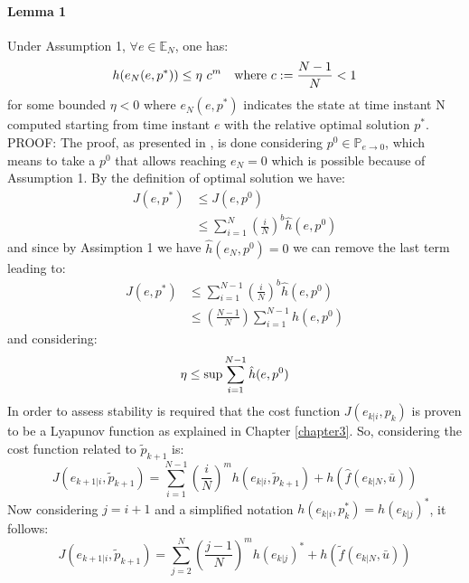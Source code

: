 \paragraph{Lemma 1} Under Assumption 1, $\forall e \in \mathbb{E}_N$, one has:
\begin{equation}
	h(e_N(e,p^*)) \leq \eta\ c^m\ \ \  \textnormal{where    } c:=\frac{N-1}{N} < 1
 	\label{lemma1}
\end{equation}
for some bounded $\eta < 0$ where $e_N(e,p^*)$ indicates the state at time instant N computed starting from time instant $e$ with the relative optimal solution $p^*$. \\

{PROOF:} The proof, as presented in \cite{alamir2018stability}, is done considering $p^0 \in \mathbb{P}_{e \to 0}$, which means to take a $p^0$ that allows reaching $e_N=0$ which is possible because of Assumption 1. By the definition of optimal solution we have: 
\begin{equation}
\begin{split}
	J(e,p^*)&\leq J(e,p^0) \\
	&\leq \sum_{i=1}^{N}\left(\frac{i}{N}\right)^b\hat{h}(e,p^0)
\end{split}
\end{equation}
and since by Assimption 1 we have $\hat{h}(e_N,p^0)=0$ we can remove the last term leading to:
\begin{equation}
\begin{split}
	J(e,p^*)&\leq \sum_{i=1}^{N-1}\left(\frac{i}{N}\right)^b\hat{h}(e,p^0) \\
	&\leq \left(\frac{N-1}{N}\right)\sum_{i=1}^{N-1}\hat{h}(e,p^0)
\end{split}
\end{equation}
and considering:
\begin{equation}
 \eta \leq \textnormal{sup} \sum_{i=1}^{N-1}\hat{h}(e,p^0)
\end{equation}
In order to assess stability is required that the cost function $J({e}_{k|i},{p}_k)$ is proven to be a Lyapunov function as explained in Chapter \ref{chapter3}. So, considering the cost function related to $\tilde{p}_{k+1}$ is:
\begin{equation*}
    J({e}_{k+1|i},\tilde{p}_{k+1})=\sum_{i=1}^{N-1}\left(\frac{i}{N}\right)^m h({e}_{k|i},\tilde{p}_{k+1})+h(\hat{f}(e_{k|N},\bar{u}))
\end{equation*}
Now considering $j=i+1$ and a simplified notation $h({e}_{k|i},p_{k}^*)=h(e_{k|j})^*$, it follows: 
\begin{equation*}
    J({e}_{k+1|i},\tilde{p}_{k+1})=\sum_{j=2}^{N}\left(\frac{j-1}{N}\right)^m h(e_{k|j})^*+h(\tilde{f}(e_{k|N},\bar{u}))
\end{equation*}
